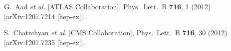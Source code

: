 \documentclass[10pt]{article}
\begin{document}
\begin{thebibliography}{99}


  G.~Aad {\it et al.}  [ATLAS Collaboration],
  Phys.\ Lett.\ B {\bf 716}, 1 (2012)
  [arXiv:1207.7214 [hep-ex]].
  
  
  S.~Chatrchyan {\it et al.}  [CMS Collaboration],
  Phys.\ Lett.\ B {\bf 716}, 30 (2012)
  [arXiv:1207.7235 [hep-ex]].



\end{thebibliography}

 
\end{document}
